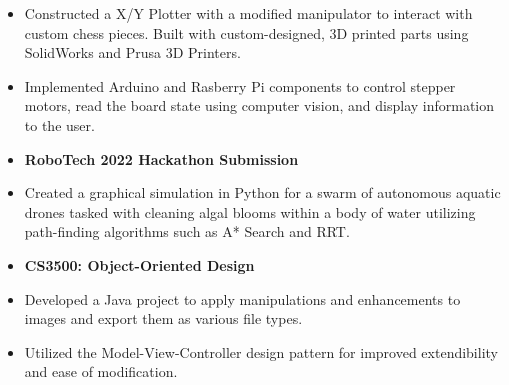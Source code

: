 \documentclass[10pt,a4paper,ragged2e,withhyper]{altacv}
\begin{document}
\begin{paracol}{2}
\begin{itemize}
        \item Constructed a X/Y Plotter with a modified manipulator to interact with custom chess pieces. Built with custom-designed, 3D printed parts using SolidWorks and Prusa 3D Printers.
        \item Implemented Arduino and Rasberry Pi components to control stepper motors, read the board state using computer vision, and display information to the user.
    \end{itemize}
    \begin{itemize}
        \item[] \textbf{RoboTech 2022 Hackathon Submission}
        \item Created a graphical simulation in Python for a swarm of autonomous aquatic drones tasked with cleaning algal blooms within a body of water utilizing path-finding algorithms such as A* Search and RRT.
    \end{itemize}
    \begin{itemize}
        \item[] \textbf{CS3500: Object-Oriented Design}
        \item Developed a Java project to apply manipulations and enhancements to images and export them as various file types.
        \item Utilized the Model-View-Controller design pattern for improved extendibility and ease of modification.
    \end{itemize}



\end{paracol}
\end{document}
